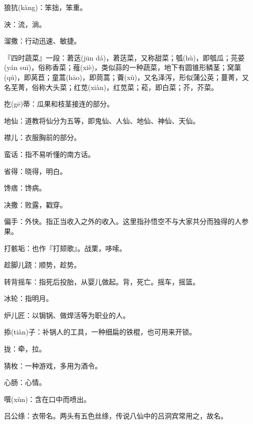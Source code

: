 \startbuffer[936]
狼犺(kàng)：笨拙，笨重。
\stopbuffer


\startbuffer[937]
泱：流，淌。
\stopbuffer


\startbuffer[938]
溜撒：行动迅速、敏捷。
\stopbuffer


\startbuffer[939]
『四时蔬菜』一段：莙荙(jūn dá)，莙荙菜，又称甜菜；瓠(hù)，即瓠瓜；芫荽(yán suī)，俗称香菜；薤(xiè)，类似蒜的一种蔬菜，地下有圆锥形鳞茎；窝蕖(qú)，即莴苣；童蒿(hāo)，即茼蒿；藚(xù)，又名泽泻，形似蒲公英；蔓菁，又名芜菁，俗称大头菜；红苋(xiàn)，红苋菜；菘，即白菜；芥，芥菜。
\stopbuffer


\startbuffer[940]
扢(gē)蒂：瓜果和枝茎接连的部分。
\stopbuffer


\startbuffer[941]
地仙：道教将仙分为五等，即鬼仙、人仙、地仙、神仙、天仙。
\stopbuffer


\startbuffer[942]
襟儿：衣服胸前的部分。
\stopbuffer


\startbuffer[943]
蛮话：指不易听懂的南方话。
\stopbuffer


\startbuffer[944]
省得：晓得，明白。
\stopbuffer


\startbuffer[945]
馋痞：馋病。
\stopbuffer


\startbuffer[946]
决撒：败露，戳穿。
\stopbuffer


\startbuffer[947]
偏手：外快。指正当收入之外的收入。这里指孙悟空不与大家共分而独得的人参果。
\stopbuffer


\startbuffer[948]
打骸垢：也作『打颏歌』。战栗，哆嗦。
\stopbuffer


\startbuffer[949]
趁脚儿跷：顺势，趁势。
\stopbuffer


\startbuffer[950]
转背摇车：指死后投胎，从婴儿做起。背，死亡。摇车，摇篮。
\stopbuffer


\startbuffer[951]
冰轮：指明月。
\stopbuffer


\startbuffer[952]
炉儿匠：以锔锅、做焊活等为职业的人。
\stopbuffer


\startbuffer[953]
掭(tiàn)子：补锅人的工具，一种细扁的铁棍，也可用来开锁。
\stopbuffer


\startbuffer[954]
拢：牵，拉。
\stopbuffer


\startbuffer[955]
猜枚：一种游戏，多用为酒令。
\stopbuffer


\startbuffer[956]
心肠：心情。
\stopbuffer


\startbuffer[957]
噀(xùn)：含在口中而喷出。
\stopbuffer


\startbuffer[958]
吕公绦：衣带名。两头有五色丝绦，传说八仙中的吕洞宾常用之，故名。
\stopbuffer


